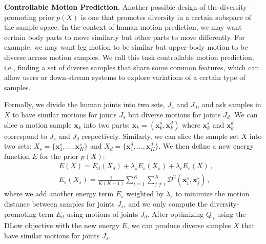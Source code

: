 \documentclass[runningheads]{llncs}
\begin{document}
	\vspace{1mm}
	\noindent\textbf{Controllable Motion Prediction.} 
	Another possible design of the diversity-promoting prior $p(X)$ is one that promotes diversity in a certain subspace of the sample space. In the context of human motion prediction, we may want certain body parts to move similarly but other parts to move differently. For example, we may want leg motion to be similar but upper-body motion to be diverse across motion samples.
	We call this task controllable motion prediction, i.e., finding a set of diverse samples that share some common features, which can allow users or down-stream systems to explore variations of a certain type of samples.
	
	Formally, we divide the human joints into two sets, $J_s$ and $J_d$, and ask samples in $X$ to have similar motions for joints $J_s$ but diverse motions for joints $J_d$. 
	We can slice a motion sample $\mathbf{x}_k$ into two parts: $\mathbf{x}_k = \left(\mathbf{x}_k^s, \mathbf{x}_k^d\right)$ where $\mathbf{x}_k^s$ and $\mathbf{x}_k^d$ correspond to $J_s$ and $J_d$ respectively. Similarly, we can slice the sample set $X$ into two sets: $X_s = \{\mathbf{x}_1^s, \ldots, \mathbf{x}_K^s\}$ and $X_d = \{\mathbf{x}_1^d, \ldots, \mathbf{x}_K^d\}$. We then define a new energy function $E$ for the prior $p(X)$:
	\begin{align}
	\label{eq:human_ctrl}
	&E(X) = E_d(X_d) + \lambda_s E_s(X_s) + \lambda_r E_r(X)\,,\\
	&E_s(X_s) = \frac{1}{K(K-1)}\sum_{i=1}^K\sum_{j\neq i}^K \mathcal{D}^2(\mathbf{x}_i^s, \mathbf{x}_j^s)\,,
	\end{align}
	where we add another energy term $E_s$ weighted by $\lambda_s$ to minimize the motion distance between samples for joints $J_s$, and we only compute the diversity-promoting term $E_d$ using motions of joints $J_d$.
	After optimizing $Q_\gamma$ using the DLow objective with the new energy $E$, we can produce diverse samples $X$ that have similar motions for joints $J_s$.
	
\end{document}
